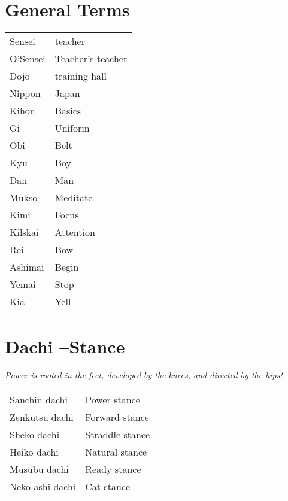 \documentclass[11pt]{article}
\begin{document}
\section{General Terms}
\label{sec:orgd2e0074}
\begin{center}
\begin{tabular}{ll}
Sensei & teacher\\
O'Sensei & Teacher's teacher\\
Dojo & training hall\\
Nippon & Japan\\
Kihon & Basics\\
Gi & Uniform\\
Obi & Belt\\
Kyu & Boy\\
Dan & Man\\
Mukso & Meditate\\
Kimi & Focus\\
Kilskai & Attention\\
Rei & Bow\\
Ashimai & Begin\\
Yemai & Stop\\
Kia & Yell\\
\end{tabular}
\end{center}

\section{Dachi --Stance}
\label{sec:org0eb2c4f}
\begin{center}
\emph{Power is rooted in the feet, developed by the knees, and directed by the hips!}
\end{center}

\begin{center}
\begin{tabular}{ll}
Sanchin   dachi & Power   stance\\
Zenkutsu  dachi & Forward stance\\
Sheko     dachi & Straddle stance\\
Heiko     dachi & Natural stance\\
Musubu    dachi & Ready   stance\\
Neko ashi dachi & Cat     stance\\
\end{tabular}
\end{center}
\end{document}
